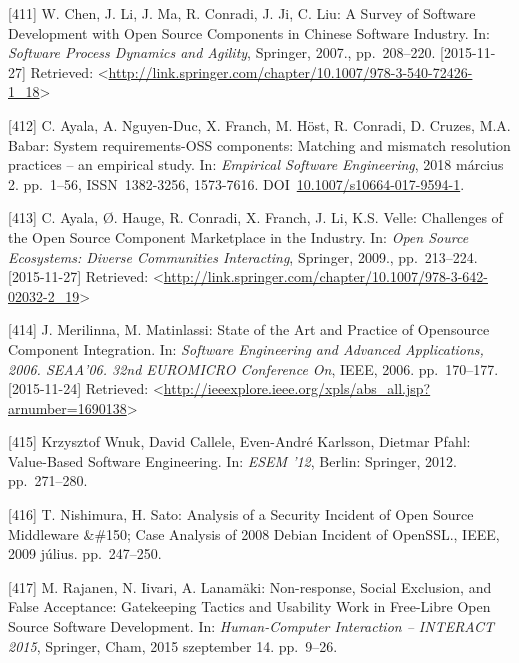 \documentclass[12pt,magyar,a4paper,oneside]{scrreprt}
\newenvironment{cslreferences}%
  {}%
  {\par}
\begin{document}
\begin{cslreferences}
\leavevmode\hypertarget{ref-chen_survey_2007}{}%
{[}411{]} W. Chen, J. Li, J. Ma, R. Conradi, J. Ji, C. Liu: A Survey of
Software Development with Open Source Components in Chinese Software
Industry. In: \emph{Software Process Dynamics and Agility}, Springer,
2007., pp.~208--220. {[}2015-11-27{]} Retrieved:
\textless{}\url{http://link.springer.com/chapter/10.1007/978-3-540-72426-1_18}\textgreater{}

\leavevmode\hypertarget{ref-ayala_system_2018}{}%
{[}412{]} C. Ayala, A. Nguyen-Duc, X. Franch, M. Höst, R. Conradi, D.
Cruzes, M.A. Babar: System requirements-OSS components: Matching and
mismatch resolution practices -- an empirical study. In: \emph{Empirical
Software Engineering}, 2018 március 2. pp.~1--56, ISSN~1382-3256,
1573-7616.
DOI~\href{https://doi.org/10.1007/s10664-017-9594-1}{10.1007/s10664-017-9594-1}.

\leavevmode\hypertarget{ref-ayala_challenges_2009}{}%
{[}413{]} C. Ayala, Ø. Hauge, R. Conradi, X. Franch, J. Li, K.S. Velle:
Challenges of the Open Source Component Marketplace in the Industry. In:
\emph{Open Source Ecosystems: Diverse Communities Interacting},
Springer, 2009., pp.~213--224. {[}2015-11-27{]} Retrieved:
\textless{}\url{http://link.springer.com/chapter/10.1007/978-3-642-02032-2_19}\textgreater{}

\leavevmode\hypertarget{ref-merilinna_state_2006}{}%
{[}414{]} J. Merilinna, M. Matinlassi: State of the Art and Practice of
Opensource Component Integration. In: \emph{Software Engineering and
Advanced Applications, 2006. SEAA'06. 32nd EUROMICRO Conference On},
IEEE, 2006. pp.~170--177. {[}2015-11-24{]} Retrieved:
\textless{}\url{http://ieeexplore.ieee.org/xpls/abs_all.jsp?arnumber=1690138}\textgreater{}

\leavevmode\hypertarget{ref-krzysztof_wnuk_value-based_2012}{}%
{[}415{]} Krzysztof Wnuk, David Callele, Even-André Karlsson, Dietmar
Pfahl: Value-Based Software Engineering. In: \emph{ESEM '12}, Berlin:
Springer, 2012. pp.~271--280.

\leavevmode\hypertarget{ref-nishimura_analysis_2009}{}%
{[}416{]} T. Nishimura, H. Sato: Analysis of a Security Incident of Open
Source Middleware \&\#150; Case Analysis of 2008 Debian Incident of
OpenSSL., IEEE, 2009 július. pp.~247--250.

\leavevmode\hypertarget{ref-rajanen_non-response_2015}{}%
{[}417{]} M. Rajanen, N. Iivari, A. Lanamäki: Non-response, Social
Exclusion, and False Acceptance: Gatekeeping Tactics and Usability Work
in Free-Libre Open Source Software Development. In: \emph{Human-Computer
Interaction -- INTERACT 2015}, Springer, Cham, 2015 szeptember 14.
pp.~9--26.


\end{cslreferences}
\end{document}
